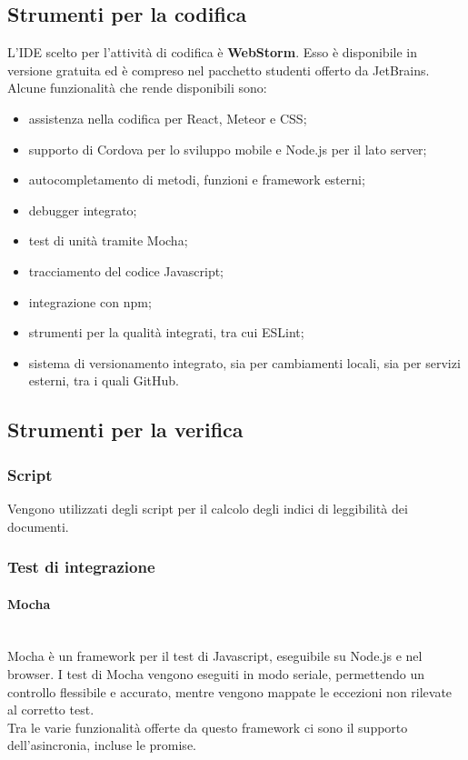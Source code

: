 \subsection{Strumenti per la codifica}
L'IDE scelto per l'attività di codifica è \textbf{WebStorm}. Esso è disponibile in versione gratuita ed è compreso nel pacchetto studenti offerto da JetBrains. Alcune funzionalità che rende disponibili sono:
\begin{itemize}
	\item assistenza nella codifica per React, Meteor e CSS;
	\item supporto di Cordova per lo sviluppo mobile e Node.js per il lato server;
	\item autocompletamento di metodi, funzioni e framework esterni;
	\item debugger integrato;
	\item test di unità tramite Mocha;
	\item tracciamento del codice Javascript;
	\item integrazione con npm;
	\item strumenti per la qualità integrati, tra cui ESLint;
	\item sistema di versionamento integrato, sia per cambiamenti locali, sia per servizi esterni, tra i quali GitHub.
\end{itemize}

\subsection{Strumenti per la verifica}
\subsubsection{Script}
Vengono utilizzati degli script per il calcolo degli indici di leggibilità dei documenti.

\subsubsection{Test di integrazione}
\paragraph{Mocha}\mbox{}\\
Mocha è un framework per il test di Javascript, eseguibile su Node.js e nel browser. I test di Mocha vengono eseguiti in modo seriale, permettendo un controllo flessibile e accurato, mentre vengono mappate le eccezioni non rilevate al corretto test.\\
Tra le varie funzionalità offerte da questo framework ci sono il supporto dell'asincronia, incluse le promise.

